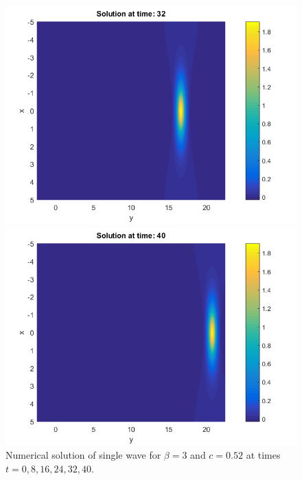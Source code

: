 \documentclass[11pt,a4paper,twoside]{article}
\begin{document}
\begin{figure}[!htbp]
\begin{minipage}[b]{0.31\linewidth}
		 \includegraphics[width=\linewidth]{Pictures/Solution_bt3_t=32.png}
	\end{minipage}
	\begin{minipage}[b]{0.31\linewidth}
		 \includegraphics[width=\linewidth]{Pictures/Solution_bt3_t=40.png}
	\end{minipage}
	\caption{Numerical solution of single wave for $\beta=3$ and $c = 0.52$ at times $t=0,8,16,24,32,40$.}
	\label{fig:oneWaveB}
\end{figure}
\end{document}
